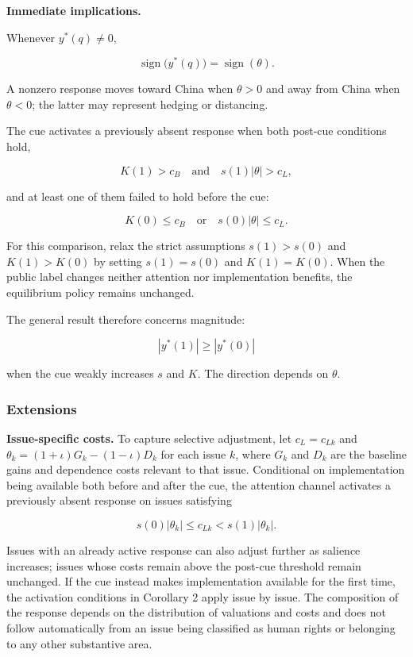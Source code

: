 \documentclass[referee,pdflatex,sn-basic]{sn-jnl}
\theoremstyle{thmstylethree}
\begin{document}
\medskip

\noindent\textbf{Immediate implications.}

Whenever $y^*(q)\neq0$,

\[
\operatorname{sign}\bigl(y^*(q)\bigr)=\operatorname{sign}(\theta).
\]

A nonzero response moves toward China when $\theta>0$ and away from China when $\theta<0$; the latter may represent hedging or distancing.
\endmodelcorollary

The cue activates a previously absent response when both post-cue conditions hold,

\[
K(1)>c_B
\quad\text{and}\quad
s(1)|\theta|>c_L,
\]

and at least one of them failed to hold before the cue:

\[
K(0)\leq c_B
\quad\text{or}\quad
s(0)|\theta|\leq c_L.
\]
\endmodelcorollary

For this comparison, relax the strict assumptions $s(1)>s(0)$ and $K(1)>K(0)$ by setting $s(1)=s(0)$ and $K(1)=K(0)$. When the public label changes neither attention nor implementation benefits, the equilibrium policy remains unchanged.
\endmodelcorollary

The general result therefore concerns magnitude:

\[
|y^*(1)|\geq|y^*(0)|
\]

when the cue weakly increases \(s\) and \(K\). The direction depends on \(\theta\).

\subsubsection{Extensions}\label{extensions}

\medskip

\noindent\textbf{Issue-specific costs.}
To capture selective adjustment, let \(c_L=c_{Lk}\) and \(\theta_k=(1+\iota)G_k-(1-\iota)D_k\) for each issue \(k\), where \(G_k\) and \(D_k\) are the baseline gains and dependence costs relevant to that issue. Conditional on implementation being available both before and after the cue, the attention channel activates a previously absent response on issues satisfying

\[
s(0)|\theta_k|\leq c_{Lk}<s(1)|\theta_k|.
\]

Issues with an already active response can also adjust further as salience increases; issues whose costs remain above the post-cue threshold remain unchanged. If the cue instead makes implementation available for the first time, the activation conditions in Corollary 2 apply issue by issue. The composition of the response depends on the distribution of valuations and costs and does not follow automatically from an issue being classified as human rights or belonging to any other substantive area.
\end{document}
